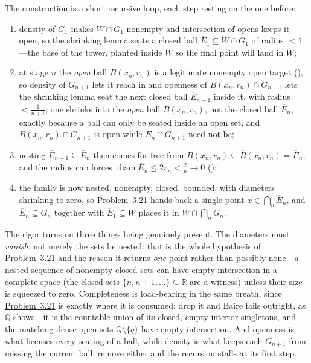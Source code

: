 \documentclass[main.tex]{subfiles}
\begin{document}
\begin{Reflection}
The construction is a short recursive loop, each step resting on the one before:
\begin{enumerate}[leftmargin=1.7em,itemsep=3pt,topsep=2pt,label=\textnormal{(\arabic*)}]
  \item density of $G_1$ makes $W\cap G_1$ nonempty and intersection-of-opens keeps it open, so the
        shrinking lemma seats a closed ball $\overline E_1\subseteq W\cap G_1$ of radius $<1$---the base
        of the tower, planted inside $W$ so the final point will land in $W$;
  \item at stage $n$ the \emph{open} ball $B(x_n,r_n)$ is a legitimate nonempty open target
        (), so density of $G_{n+1}$ lets it reach in and openness of
        $B(x_n,r_n)\cap G_{n+1}$ lets the shrinking lemma seat the next closed ball
        $\overline E_{n+1}$ inside it, with radius $<\tfrac1{n+1}$; one shrinks into the \emph{open} ball
        $B(x_n,r_n)$, not the closed ball $\overline E_n$, exactly because a ball can only be seated
        inside an open set, and $B(x_n,r_n)\cap G_{n+1}$ is open while $\overline E_n\cap G_{n+1}$ need
        not be;
  \item nesting $\overline E_{n+1}\subseteq\overline E_n$ then comes for free from
        $B(x_n,r_n)\subseteq\overline B(x_n,r_n)=\overline E_n$, and the radius cap forces
        $\operatorname{diam}\overline E_n\le 2r_n<\tfrac2n\to0$ ();
  \item the family is now nested, nonempty, closed, bounded, with diameters shrinking to zero, so
        \hyperlink{prob:3.21}{Problem~3.21} hands back a single point $x\in\bigcap_n\overline E_n$, and
        $\overline E_n\subseteq G_n$ together with $\overline E_1\subseteq W$ places it in
        $W\cap\bigcap_n G_n$.
\end{enumerate}

The rigor turns on three things being genuinely present. The diameters must \emph{vanish}, not merely the
sets be nested: that is the whole hypothesis of \hyperlink{prob:3.21}{Problem~3.21} and the reason it
returns \emph{one} point rather than possibly none---a nested sequence of nonempty closed sets can have
empty intersection in a complete space (the closed sets $\{n,n+1,\dots\}\subseteq\mathbb R$ are a witness)
unless their size is squeezed to zero. Completeness is load-bearing in the same breath, since
\hyperlink{prob:3.21}{Problem~3.21} is exactly where it is consumed; drop it and Baire fails outright, as
$\mathbb Q$ shows---it is the countable union of its closed, empty-interior singletons, and the matching
dense open sets $\mathbb Q\setminus\{q\}$ have empty intersection. And openness is what licenses every
seating of a ball, while density is what keeps each $G_{n+1}$ from missing the current ball; remove either
and the recursion stalls at its first step.


\end{Reflection}
\end{document}
